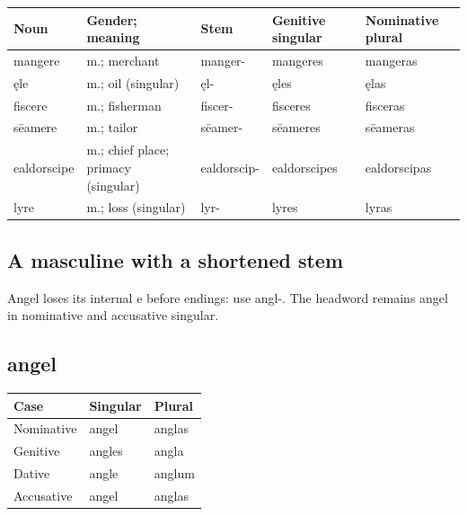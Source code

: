 \par\begingroup
\fontsize{10.5}{13.2}\selectfont
\setlength{\LTleft}{0pt}\setlength{\LTright}{\fill}
\noindent
\begin{tabular}{@{}>{\raggedright\arraybackslash}p{19.5mm}>{\raggedright\arraybackslash}p{29.97mm}>{\raggedright\arraybackslash}p{18.5mm}>{\raggedright\arraybackslash}p{22.39mm}>{\raggedright\arraybackslash}p{22.39mm}@{}}
\toprule
\textbf{Noun} & \textbf{Gender; meaning} & \textbf{Stem} & \textbf{Genitive singular} & \textbf{Nominative plural} \\
\midrule
mangere & m.; merchant & manger- & mangeres & mangeras \\
ęle & m.; oil (singular) & ęl- & ęles & ęlas \\
fiscere & m.; fisherman & fiscer- & fisceres & fisceras \\
sēamere & m.; tailor & sēamer- & sēameres & sēameras \\
ealdorscipe & m.; chief place; primacy (singular) & ealdorscip- & ealdorscipes & ealdorscipas \\
lyre & m.; loss (singular) & lyr- & lyres & lyras \\
\bottomrule
\end{tabular}
\par\endgroup

\subsection*{A masculine with a shortened stem}

Angel loses its internal e before endings: use angl-. The headword remains angel in nominative and accusative singular.

\subsection*{angel}

\par\begingroup
\fontsize{10.5}{13.2}\selectfont
\setlength{\LTleft}{0pt}\setlength{\LTright}{\fill}
\noindent
\begin{tabular}{@{}>{\raggedright\arraybackslash}p{39.46mm}>{\raggedright\arraybackslash}p{39.46mm}>{\raggedright\arraybackslash}p{39.46mm}@{}}
\toprule
\textbf{Case} & \textbf{Singular} & \textbf{Plural} \\
\midrule
Nominative & angel & anglas \\
Genitive & angles & angla \\
Dative & angle & anglum \\
Accusative & angel & anglas \\
\bottomrule
\end{tabular}
\par\endgroup

